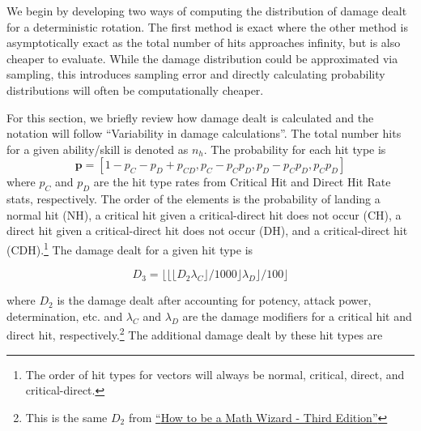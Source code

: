 \documentclass{article}
\begin{document}
    We begin by developing two ways of computing the distribution of damage dealt for a deterministic rotation. The first method is exact where the other method is asymptotically exact as the total number of hits approaches infinity, but is also cheaper to evaluate. While the damage distribution could be approximated via sampling, this introduces sampling error and directly calculating probability distributions will often be computationally cheaper. 
    
    For this section, we briefly review how damage dealt is calculated and the notation will follow {``Variability in damage calculations''}. The total number hits for a given ability/skill is denoted as $n_h$. The probability for each hit type is 
    \begin{equation}\label{eqn:probability}
        \textbf{p} = [1 - p_C - p_D + p_{CD}, p_C - p_C p_D, p_D  - p_C p_D, p_C p_D]
    \end{equation}
    where $p_C$ and $p_D$ are the hit type rates from Critical Hit and Direct Hit Rate stats, respectively. The order of the elements is the probability of landing a normal hit (NH), a critical hit given a critical-direct hit does not occur (CH), a direct hit given a critical-direct hit does not occur (DH), and a critical-direct hit (CDH).\footnote{The order of hit types for vectors will always be normal, critical, direct, and critical-direct.} The damage dealt for a given hit type is 

    \begin{equation}\label{eqn:d3}
        D_3 = \lfloor \lfloor \lfloor D_2 \lambda_C \rfloor / 1000 \rfloor \lambda_D \rfloor / 100 \rfloor
    \end{equation}

    where $D_2$ is the damage dealt after accounting for potency, attack power, determination, etc. and $\lambda_C$ and $\lambda_D$ are the damage modifiers for a critical hit and direct hit, respectively.\footnote{
        This is the same $D_2$ from \href{https://docs.google.com/document/d/1OpfKYmf31FpES3IHOrl3H8phU4Np8FChH4B4lP1ZE08/}{``{How to be a Math Wizard - Third Edition}''}
    } The additional damage dealt by these hit types are
\end{document}
